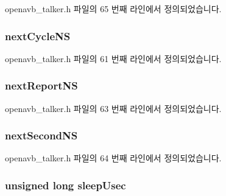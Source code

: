 openavb\+\_\+talker.\+h 파일의 65 번째 라인에서 정의되었습니다.

\subsubsection[{\texorpdfstring{next\+Cycle\+NS}{nextCycleNS}}]{ next\+Cycle\+NS}\hypertarget{structtalker__data__t_a50f30f37b36cd7b3518289897953a685}{}\label{structtalker__data__t_a50f30f37b36cd7b3518289897953a685}


openavb\+\_\+talker.\+h 파일의 61 번째 라인에서 정의되었습니다.

\subsubsection[{\texorpdfstring{next\+Report\+NS}{nextReportNS}}]{ next\+Report\+NS}\hypertarget{structtalker__data__t_a9ed17cd4b781b5f67b657069d5b4382f}{}\label{structtalker__data__t_a9ed17cd4b781b5f67b657069d5b4382f}


openavb\+\_\+talker.\+h 파일의 63 번째 라인에서 정의되었습니다.

\subsubsection[{\texorpdfstring{next\+Second\+NS}{nextSecondNS}}]{ next\+Second\+NS}\hypertarget{structtalker__data__t_af7e8f07dc431af3a82b4ee9b960772ce}{}\label{structtalker__data__t_af7e8f07dc431af3a82b4ee9b960772ce}


openavb\+\_\+talker.\+h 파일의 64 번째 라인에서 정의되었습니다.

\subsubsection[{\texorpdfstring{sleep\+Usec}{sleepUsec}}]{\setlength{\rightskip}{0pt plus 5cm}unsigned long sleep\+Usec}\hypertarget{structtalker__data__t_a73390de3ee9147b58f6eb97fcd64a0dd}{}\label{structtalker__data__t_a73390de3ee9147b58f6eb97fcd64a0dd}


